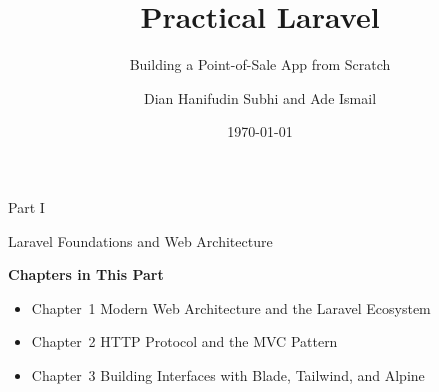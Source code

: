\documentclass[
    paper=23cm:15.5cm,   %
    11pt,               %
    twoside,            %
    openany,            %
    bibliography=totoc, %
]{scrbook}            %
\title{Practical Laravel}
\subtitle{Building a Point-of-Sale App from Scratch}
\author{Dian Hanifudin Subhi and Ade Ismail}
\date{\today}
\begin{document}
\frontmatter









\renewcommand{\contentsname}{Table of Contents}
\tableofcontents

\listoftables

\mainmatter

\vspace*{4cm}
{\fontsize{28}{34}\sffamily\bfseries\raggedright Part I\par}
\vspace{6pt}
{\fontsize{22}{28}\sffamily\bfseries\raggedright Laravel Foundations and Web Architecture\par}
\vspace{16pt}
{\large\sffamily\bfseries Chapters in This Part}\par
\vspace{6pt}
\begin{itemize}[topsep=0pt, itemsep=2pt]
  \item Chapter~1 \textbullet{} Modern Web Architecture and the Laravel Ecosystem
  \item Chapter~2 \textbullet{} HTTP Protocol and the MVC Pattern
  \item Chapter~3 \textbullet{} Building Interfaces with Blade, Tailwind, and Alpine
\end{itemize}
\newpage






\end{document}
